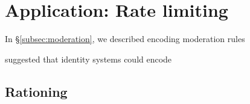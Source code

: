\section{Application: Rate limiting}

In \S\ref{subsec:moderation}, we described encoding moderation
rules 

suggested that identity systems could encode 



\subsection{Rationing}



\endinput




\subsection{}



\subsection{}





